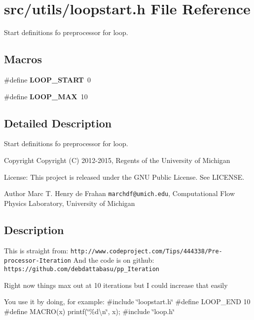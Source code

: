 \section{src/utils/loopstart.h File Reference}
\label{loopstart_8h}


Start definitions fo preprocessor for loop.  


\subsection*{Macros}
\begin{DoxyCompactItemize}
\item 
\#define {\bfseries L\-O\-O\-P\-\_\-\-S\-T\-A\-R\-T}~0\label{loopstart_8h_a9507da22ddeb73d01876cdf1562696d7}

\item 
\#define {\bfseries L\-O\-O\-P\-\_\-\-M\-A\-X}~10\label{loopstart_8h_a1174cdfd5f134281d6b0f0a208118c97}

\end{DoxyCompactItemize}


\subsection{Detailed Description}
Start definitions fo preprocessor for loop. \begin{DoxyCopyright}{Copyright}
Copyright (C) 2012-\/2015, Regents of the University of Michigan 
\end{DoxyCopyright}
\begin{DoxyParagraph}{License\-:}
This project is released under the G\-N\-U Public License. See L\-I\-C\-E\-N\-S\-E. 
\end{DoxyParagraph}
\begin{DoxyAuthor}{Author}
Marc T. Henry de Frahan {\tt marchdf@umich.\-edu}, Computational Flow Physics Laboratory, University of Michigan 
\end{DoxyAuthor}
\subsection{Description}\label{scalar__def_8h_Description}
This is straight from\-: {\tt http\-://www.\-codeproject.\-com/\-Tips/444338/\-Pre-\/processor-\/\-Iteration} And the code is on github\-: {\tt https\-://github.\-com/debdattabasu/pp\-\_\-\-Iteration}

Right now things max out at 10 iterations but I could increase that easily

You use it by doing, for example\-: \#include \char`\"{}loopstart.\-h\char`\"{} \#define L\-O\-O\-P\-\_\-\-E\-N\-D 10 \#define M\-A\-C\-R\-O(x) printf(\char`\"{}\%d\textbackslash{}n\char`\"{}, x); \#include \char`\"{}loop.\-h\char`\"{} 